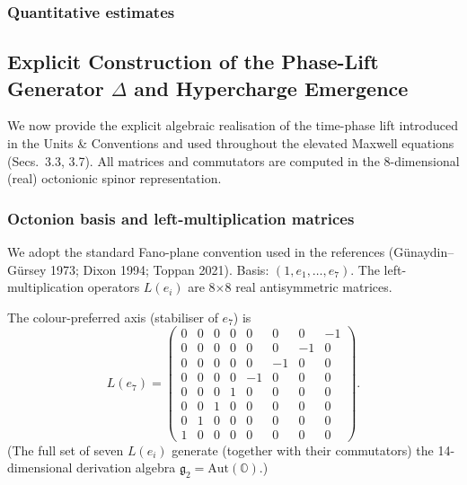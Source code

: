 \documentclass[12pt,a4paper]{article}
\begin{document}
\subsubsection*{Quantitative estimates}

\subsection{Explicit Construction of the Phase-Lift Generator \texorpdfstring{\(\Delta\)}{Delta} and Hypercharge Emergence}

We now provide the explicit algebraic realisation of the time-phase lift introduced in the Units \& Conventions and used throughout the elevated Maxwell equations (Secs.~3.3, 3.7). All matrices and commutators are computed in the 8-dimensional (real) octonionic spinor representation.

\subsubsection{Octonion basis and left-multiplication matrices}
We adopt the standard Fano-plane convention used in the references (Günaydin--Gürsey 1973; Dixon 1994; Toppan 2021). Basis: \((1, e_1,\dots,e_7)\). The left-multiplication operators \(L(e_i)\) are 8\(\times\)8 real antisymmetric matrices.

The colour-preferred axis (stabiliser of \(e_7\)) is
\begin{equation}
L(e_7) = 
\begin{pmatrix}
0 & 0 & 0 & 0 & 0 & 0 & 0 & -1 \\
0 & 0 & 0 & 0 & 0 & 0 & -1 & 0 \\
0 & 0 & 0 & 0 & 0 & -1 & 0 & 0 \\
0 & 0 & 0 & 0 & -1 & 0 & 0 & 0 \\
0 & 0 & 0 & 1 & 0 & 0 & 0 & 0 \\
0 & 0 & 1 & 0 & 0 & 0 & 0 & 0 \\
0 & 1 & 0 & 0 & 0 & 0 & 0 & 0 \\
1 & 0 & 0 & 0 & 0 & 0 & 0 & 0
\end{pmatrix}.
\end{equation}
(The full set of seven \(L(e_i)\) generate (together with their commutators) the 14-dimensional derivation algebra \(\mathfrak{g}_2 = \mathrm{Aut}(\mathbb{O})\).)
\end{document}
